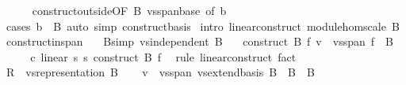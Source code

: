 \begin{isabellebody}
\ \ \ \ \isamarkupfalse%
\ construct{\isacharunderscore}{\kern0pt}outside{\isacharbrackleft}{\kern0pt}OF\ B\ vs{}{\isachardot}{\kern0pt}span{\isacharunderscore}{\kern0pt}base{\isacharcomma}{\kern0pt}\ of\ b{\isacharbrackright}{\kern0pt}\ \isamarkupfalse%
\ {\isacharparenleft}{\kern0pt}cases\ {\isachardoublequoteopen}b\ {\isasymin}\ B{\isachardoublequoteclose}{\isacharparenright}{\kern0pt}\ {\isacharparenleft}{\kern0pt}auto\ simp{\isacharcolon}{\kern0pt}\ construct{\isacharunderscore}{\kern0pt}basis{\isacharparenright}{\kern0pt}\isanewline
{}\isamarkupfalse%
\ {\isacharparenleft}{\kern0pt}intro\ linear{\isacharunderscore}{\kern0pt}construct\ module{\isacharunderscore}{\kern0pt}hom{\isacharunderscore}{\kern0pt}scale\ B{\isacharparenright}{\kern0pt}{\isacharplus}{\kern0pt}%
\endisatagproof
{\isafoldproof}%
%
\isadelimproof
\isanewline
%
\endisadelimproof
\isanewline
{}\isamarkupfalse%
\ construct{\isacharunderscore}{\kern0pt}in{\isacharunderscore}{\kern0pt}span{\isacharcolon}{\kern0pt}\isanewline
\ \ \ B{\isacharbrackleft}{\kern0pt}simp{\isacharbrackright}{\kern0pt}{\isacharcolon}{\kern0pt}\ {\isachardoublequoteopen}vs{}{\isachardot}{\kern0pt}independent\ B{\isachardoublequoteclose}\isanewline
\ \ \ {\isachardoublequoteopen}construct\ B\ f\ v\ {\isasymin}\ vs{}{\isachardot}{\kern0pt}span\ {\isacharparenleft}{\kern0pt}f\ {\isacharbackquote}{\kern0pt}\ B{\isacharparenright}{\kern0pt}{\isachardoublequoteclose}\isanewline
%
\isadelimproof
%
\endisadelimproof
%
\isatagproof
{}\isamarkupfalse%
\ {\isacharminus}{\kern0pt}\isanewline
\ \ \isamarkupfalse%
\ c{\isacharcolon}{\kern0pt}\ linear\ s{}\ s{}\ {\isachardoublequoteopen}construct\ B\ f{\isachardoublequoteclose}\ \isamarkupfalse%
\ {\isacharparenleft}{\kern0pt}rule\ linear{\isacharunderscore}{\kern0pt}construct{\isacharparenright}{\kern0pt}\ fact\isanewline
\ \ \isamarkupfalse%
\ {\isacharquery}{\kern0pt}R\ {\isacharequal}{\kern0pt}\ {\isachardoublequoteopen}vs{}{\isachardot}{\kern0pt}representation\ B{\isachardoublequoteclose}\isanewline
\ \ \isamarkupfalse%
\ {\isachardoublequoteopen}v\ {\isasymin}\ vs{}{\isachardot}{\kern0pt}span\ {\isacharparenleft}{\kern0pt}{\isacharparenleft}{\kern0pt}vs{}{\isachardot}{\kern0pt}extend{\isacharunderscore}{\kern0pt}basis\ B\ {\isacharminus}{\kern0pt}\ B{\isacharparenright}{\kern0pt}\ {\isasymunion}\ B{\isacharparenright}{\kern0pt}{\isachardoublequoteclose}\isanewline

\end{isabellebody}
